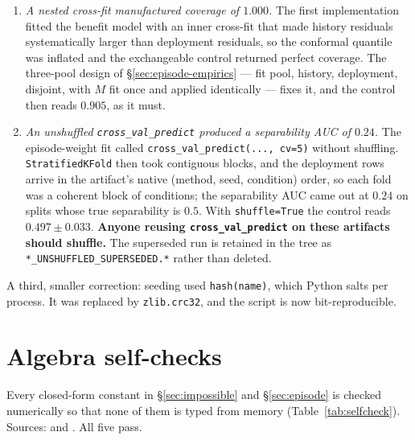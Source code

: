 \begin{enumerate}
\item \emph{A nested cross-fit manufactured coverage of $1.000$.} The first implementation fitted the
benefit model with an inner cross-fit that made history residuals systematically larger than
deployment residuals, so the conformal quantile was inflated and the exchangeable control returned
perfect coverage. The three-pool design of \S\ref{sec:episode-empirics} --- fit pool, history,
deployment, disjoint, with $M$ fit once and applied identically --- fixes it, and the control then
reads $0.905$, as it must.
\item \emph{An unshuffled \texttt{cross\_val\_predict} produced a separability AUC of $0.24$.} The
episode-weight fit called \texttt{cross\_val\_predict(..., cv=5)} without shuffling.
\texttt{StratifiedKFold} then took contiguous blocks, and the deployment rows arrive in the
artifact's native (method, seed, condition) order, so each fold was a coherent block of conditions;
the separability AUC came out at $0.24$ on splits whose true separability is $0.5$. With
\texttt{shuffle=True} the control reads $0.497\pm0.033$. \textbf{Anyone reusing
\texttt{cross\_val\_predict} on these artifacts should shuffle.} The superseded run is retained in
the tree as \texttt{*\_UNSHUFFLED\_SUPERSEDED.*} rather than deleted.
\end{enumerate}

A third, smaller correction: seeding used \texttt{hash(name)}, which Python salts per process. It was
replaced by \texttt{zlib.crc32}, and the script is now bit-reproducible.

\section{Algebra self-checks}\label{app:selfcheck}

Every closed-form constant in \S\ref{sec:impossible} and \S\ref{sec:episode} is checked numerically
so that none of them is typed from memory (Table~\ref{tab:selfcheck}). Sources:
 and
. All five pass.

